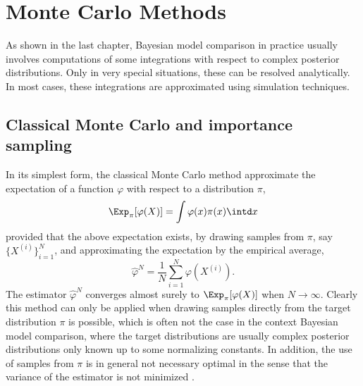 \chapter{Monte Carlo Methods}
\label{cha:Monte Carlo Methods}

As shown in the last chapter, Bayesian model comparison in practice usually
involves computations of some integrations with respect to complex posterior
distributions. Only in very special situations, these can be resolved
analytically. In most cases, these integrations are approximated using
simulation techniques.

\section{Classical Monte Carlo and importance sampling}
\label{sec:Classical Monte Carlo and importance sampling}

In its simplest form, the classical Monte Carlo method approximate the
expectation of a function $\varphi$ with respect to a distribution $\pi$,
\begin{equation}
  \Exp_{\pi}[\varphi(X)] = \int\varphi(x)\pi(x)\intd x
\end{equation}
provided that the above expectation exists, by drawing \iid samples from
$\pi$, say $\{X^{(i)}\}_{i=1}^N$, and approximating the expectation by the
empirical average,
\begin{equation}
  \hat\varphi^N = \frac{1}{N}\sum_{i=1}^N\varphi(X^{(i)}).
  \label{eq:vanilla mc}
\end{equation}
The estimator $\hat\varphi^N$ converges almost surely to
$\Exp_{\pi}[\varphi(X)]$ when $N\to\infty$. Clearly this method can only be
applied when drawing samples directly from the target distribution $\pi$ is
possible, which is often not the case in the context Bayesian model
comparison, where the target distributions are usually complex posterior
distributions only known up to some normalizing constants. In addition, the
use of samples from $\pi$ is in general not necessary optimal in the sense
that the variance of the estimator is not minimized
\cite[][sec.~3.3.2]{Robert:2004tn}.

